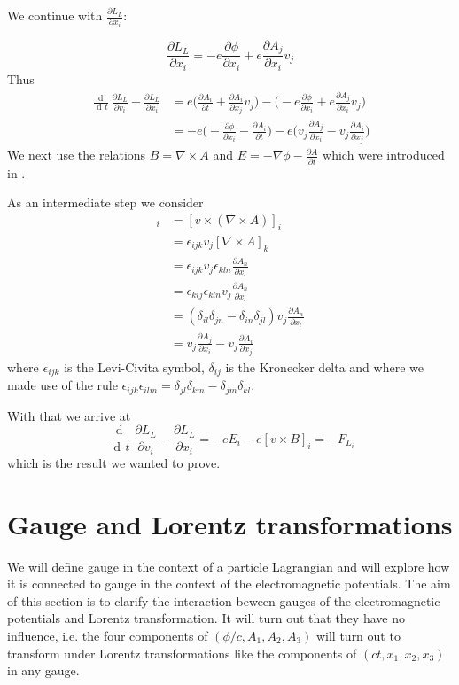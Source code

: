 \documentclass{article}
\DeclareMathOperator{\dd}{d\!}
\begin{document}
We continue with $\frac{\partial L_L}{\partial x_i}$:

\begin{equation}
    \frac{\partial L_L}{\partial x_i} = -e \frac{\partial \phi}{\partial x_i} + e \frac{\partial A_j}{\partial x_i} v_j
\end{equation}
Thus
\begin{align}
    \frac{\dd}{\dd t} \frac{\partial L_L}{\partial v_i} - \frac{\partial L_L}{\partial x_i}
    & = e \bigg(\frac{\partial A_i}{\partial t} + \frac{\partial A_i}{\partial x_j} v_j\bigg)
    - \bigg( -e \frac{\partial \phi}{\partial x_i} + e \frac{\partial A_j}{\partial x_i} v_j \bigg) \nonumber \\
    & = - e \bigg( -\frac{\partial \phi}{\partial x_i} - \frac{\partial A_i}{\partial t} \bigg)
    - e \bigg( v_j \frac{\partial A_j}{\partial x_i}  - v_j \frac{\partial A_i}{\partial x_j}  \bigg)
\end{align}
We next use the relations $B = \nabla \times A$ and $E = - \nabla \phi - \frac{\partial A}{\partial t}$ which were introduced in  \cite{LagrangeOfField}.

As an intermediate step we consider
\begin{align}
[v \times B]_i &= [v \times (\nabla \times A)]_i \nonumber \\
&=\epsilon_{ijk} v_j [\nabla \times A]_k \nonumber \\
&=\epsilon_{ijk} v_j \epsilon_{kln} \frac{\partial A_n}{\partial x_l} \nonumber \\
&=\epsilon_{kij} \epsilon_{kln} v_j  \frac{\partial A_n}{\partial x_l} \nonumber \\
&=(\delta_{il} \delta_{jn} - \delta_{in} \delta_{jl} ) v_j  \frac{\partial A_n}{\partial x_l} \nonumber \\
&=v_j \frac{\partial A_j}{\partial x_i} - v_j \frac{\partial A_i}{\partial x_j} \nonumber
\end{align}
where $\epsilon_{ijk}$ is the Levi-Civita symbol, $\delta_{ij}$ is the Kronecker delta and where we made use of the rule
$\epsilon_{ijk} \epsilon_{ilm} = \delta_{jl}\delta_{km} - \delta_{jm}\delta_{kl}$.

With that we arrive at
\begin{equation}
    \frac{\dd}{\dd t} \frac{\partial L_L}{\partial v_i} - \frac{\partial L_L}{\partial x_i}
    = - e E_i - e [v \times B]_i = -F_L_i
\end{equation}
which is the result we wanted to prove.


\section{Gauge and Lorentz transformations} \label{sectionGauge}
We will define gauge in the context of a particle Lagrangian and will explore how it is connected to gauge in the context of the electromagnetic potentials.
The aim of this section is to clarify the interaction beween gauges of the electromagnetic potentials and Lorentz transformation.
It will turn out that they have no influence,
i.e. the four components of $(\phi/c, A_1,A_2,A_3)$ will turn out to transform under Lorentz transformations like the components of $(ct,x_1,x_2,x_3)$ in any gauge.
\end{document}
